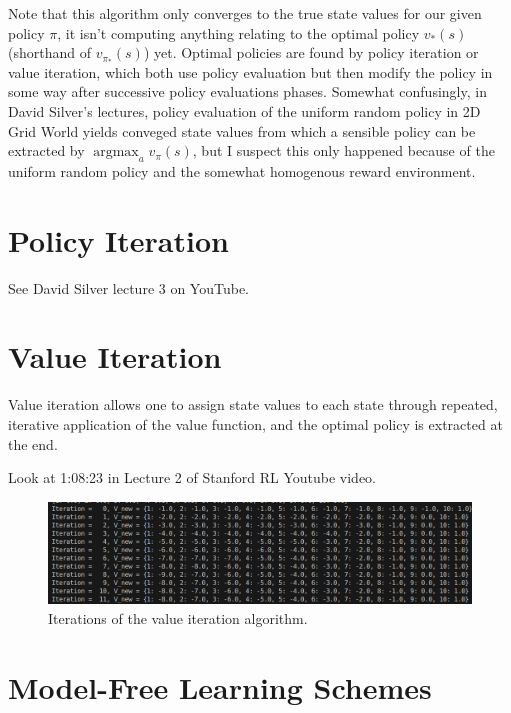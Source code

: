 \documentclass[a4paper,11pt]{article}
\DeclareMathOperator*{\argmax}{argmax}
\begin{document}
Note that this algorithm only converges to the true state values for our given policy $\pi$, it isn't computing anything relating to the optimal policy $v_{\ast}(s)$ (shorthand of $v_{\pi_\ast}(s)$) yet.  Optimal policies are found by policy iteration or value iteration, which both use policy evaluation but then modify the policy in some way after successive policy evaluations phases.  Somewhat confusingly, in David Silver's lectures, policy evaluation of the uniform random policy in 2D Grid World yields conveged state values from which a sensible policy can be extracted by $\argmax_a v_\pi(s)$, but I suspect this only happened because of the uniform random policy and the somewhat homogenous reward environment.


\section{Policy Iteration}

See David Silver lecture 3 on YouTube.

\section{Value Iteration}

Value iteration allows one to assign state values to each state through repeated, iterative application of the value function, and the optimal policy is extracted at the end.  

Look at 1:08:23 in Lecture 2 of Stanford RL Youtube video.


\begin{figure}
    \includegraphics[width=\textwidth]{images/iters-of-value-iteration-1d-grid-world-code-output.png}
    \caption{Iterations of the value iteration algorithm.}
    \label{fig:iters-of-value-iteration-1d-grid-world-code-output}
\end{figure}





\section{Model-Free Learning Schemes}
\end{document}
